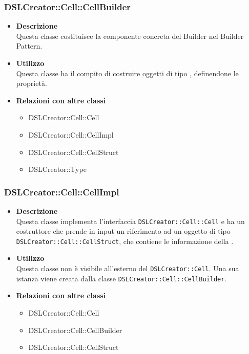  \subsubsection{DSLCreator::Cell::CellBuilder}
                    \begin{itemize}
                        \item \textbf{Descrizione} \hfill \\
                            Questa classe costituisce la componente concreta del Builder nel Builder Pattern.
                        \item \textbf{Utilizzo} \hfill \\
                            Questa classe ha il compito di costruire oggetti di tipo , definendone le proprietà.
                        \item \textbf{Relazioni con altre classi}
                            \begin{itemize}
                              \item DSLCreator::Cell::Cell
                              \item DSLCreator::Cell::CellImpl
                              \item DSLCreator::Cell::CellStruct
                              \item DSLCreator::Type
                            \end{itemize}
                    \end{itemize}

 \subsubsection{DSLCreator::Cell::CellImpl}
                    \begin{itemize}
                        \item \textbf{Descrizione} \hfill \\
                            Questa classe implementa l'interfaccia \texttt{DSLCreator::Cell::Cell} e ha un costruttore che prende in input un riferimento ad un oggetto di tipo \texttt{DSLCreator::Cell::CellStruct}, che contiene le informazione della .
                        \item \textbf{Utilizzo} \hfill \\
                            Questa classe non è visibile all'esterno del  \texttt{DSLCreator::Cell}. Una sua istanza viene creata dalla classe \texttt{DSLCreator::Cell::CellBuilder}.
                        \item \textbf{Relazioni con altre classi}
                            \begin{itemize}
                              \item DSLCreator::Cell::Cell
                              \item DSLCreator::Cell::CellBuilder
                              \item DSLCreator::Cell::CellStruct
                            \end{itemize}
                    \end{itemize}

